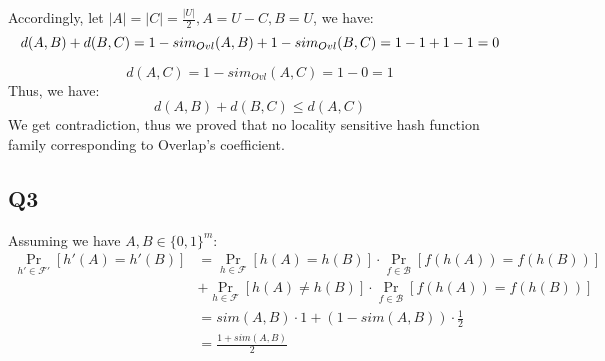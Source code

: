 \documentclass[a4paper, 12pt, titlepage]{article}
\begin{document}
Accordingly, let $|A| =  |C| = \frac{|U|}{2}, A = U - C, B = U$, we have:
\[
    d(A, B) + d(B, C) = 1 - sim_{Ovl}(A, B) + 1 - sim_{Ovl}(B, C) \\
                      = 1 - 1 + 1 - 1
                      = 0
\]     

\[
    d(A, C) = 1 - sim_{Ovl}(A, C) = 1 - 0 = 1
\]
Thus, we have:
\[
    d(A, B) + d(B, C) \leq d(A, C)
\]
We get contradiction, thus we proved that no locality sensitive hash function family corresponding to Overlap's coefficient.
\subsection{Q3}
Assuming we have $A, B \in \{0, 1\}^m$:
\begin{equation}
    \begin{aligned}
        \Pr_{h' \in \mathcal F'} \left[ h'(A) = h'(B) \right] &= \Pr_{h \in \mathcal F} \left[ h(A) = h(B) \right] \cdot \Pr_{f \in \mathcal B} \left[ f(h(A)) = f(h(B))\right] \\
                                                              &+ \Pr_{h \in \mathcal F} \left[ h(A) \neq h(B) \right] \cdot \Pr_{f \in \mathcal B} \left[ f(h(A)) = f(h(B))\right] \\
                                                              &= sim(A, B) \cdot 1 + (1 - sim(A, B)) \cdot \frac{1}{2} \\
                                                              &= \frac{1 + sim(A, B)}{2}
    \end{aligned}
\end{equation}
\end{document}
